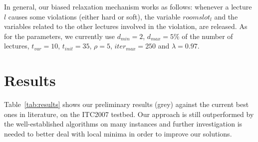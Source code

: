 \documentclass{llncs}
\begin{document}
\noindent
In general, our biased relaxation mechanism works as follows: whenever a lecture $l$ causes some violations (either hard or soft), the variable $roomslot_l$ and the variables related to the other lectures involved in the violation, are released. As for the parameters, we currently use $d_{min} = 2$, $d_{max} = 5\%$ of the number of lectures, $t_{var} = 10$, $t_{init} = 35$, $\rho = 5$, $iter_{max} = 250$ and $\lambda = 0.97$.

\section{Results}\label{sec:results}

Table~\ref{tab:results} shows our preliminary results (grey) against the current best ones in literature, on the ITC2007 testbed. Our approach is still outperformed by the well-established algorithms on many instances and further investigation is needed to better deal with local minima in order to improve our solutions. 
\end{document}

